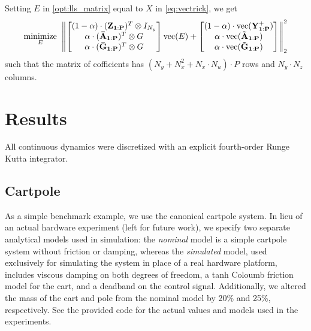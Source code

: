 \documentclass{article}
\begin{document}
  Setting $E$ in \eqref{opt:lls_matrix} equal to $X$ in \eqref{eq:vectrick}, we get
  \begin{align} \label{opt:lls_matrix}
      \underset{E}{\text{minimize}} \;\;  
      \norm{
          \begin{bmatrix}
              (1-\alpha)\cdot(\mathbf{Z_{1:P}})^T \otimes I_{N_y} \\
              \alpha\cdot(\mathbf{\bar{A}_{1:P}})^T \otimes G \\
              \alpha\cdot(\mathbf{\bar{G}_{1:P}})^T \otimes G \\
          \end{bmatrix}
          \text{vec}(E)
          +
          \begin{bmatrix}
              (1-\alpha)\cdot\text{vec}(\mathbf{Y^+_{1:P}}) \\
              \alpha\cdot\text{vec}(\mathbf{\tilde{A}_{1:P}}) \\
              \alpha\cdot\text{vec}(\mathbf{\tilde{G}_{1:P}})
          \end{bmatrix}
      }_2^2
  \end{align}
  such that the matrix of cofficients has $(N_y + N_x^2 + N_x \cdot N_u) \cdot P$ rows and 
  $N_y \cdot N_z$ columns.

\section{Results} \label{sec:results}
All continuous dynamics were discretized with an explicit fourth-order Runge Kutta 
integrator.

\subsection{Cartpole}
As a simple benchmark example, we use the canonical cartpole system. In lieu of an actual 
hardware experiment (left for future work), we specify two separate analytical models used 
in simulation: the \textit{nominal} model is a simple cartpole system without friction or 
damping, whereas the \textit{simulated} model, used exclusively for simulating the system
in place of a real hardware platform, includes viscous damping on both degrees of freedom,
a tanh Coloumb friction model for the cart, and a deadband on the control signal. 
Additionally, we altered the mass of the cart and pole from the nominal model by 20\% and 
25\%, respectively. See the provided code for the actual values and models used in the 
experiments.
\end{document}
